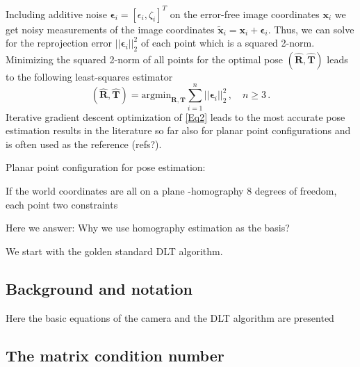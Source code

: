 \documentclass[letterpaper, 10 pt, conference]{ieeeconf}  %
\begin{document}
Including additive noise $\bm{\epsilon}_i = [\epsilon_i, \zeta_i]^T$ on the error-free image coordinates $\mathbf{x}_i$ we get noisy measurements of the image coordinates
$\tilde{\mathbf{x}}_i = \mathbf{x}_i + \bm{\epsilon}_i$.
Thus, we can solve for the reprojection error $|\!|\bm{\epsilon}_i|\!|_2^2$ of each point
which is a squared 2-norm. Minimizing the squared 2-norm of all points for the optimal pose $(\hat{\mathbf{R}}, \hat{\mathbf{T}})$ leads to the following least-squares estimator
\begin{equation}
\label{Eq2}
 (\hat{\mathbf{R}}, \hat{\mathbf{T}}) = \text{argmin}_{\mathbf{R}, \mathbf{T}} 
 \sum\limits_{i=1}^n |\!|\bm{\epsilon}_i|\!|_2^2\, , \quad n \geq 3 \,.
\end{equation}
Iterative gradient descent optimization of \eqref{Eq2} leads to the most accurate pose estimation results in the literature so far
also for planar point configurations and is often used as the reference (refs?).

Planar point configuration for pose estimation:

If the world coordinates are all on a plane 
-homography 8 degrees of freedom, each point two constraints

Here we answer: Why we use homography estimation as the basis?

We start with the golden standard DLT algorithm.

\subsection{Background and notation}
Here the basic equations of the camera and the DLT algorithm are presented

\subsection{The matrix condition number}

\end{document}
